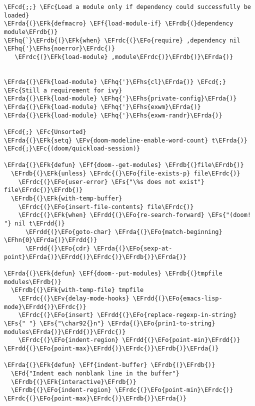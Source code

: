 \documentclass[a4wide,10pt]{article}
\newcommand{\EFc}[1]{\textcolor{EFc}{#1}} %
\newcommand{\EFcd}[1]{\textcolor{EFcd}{#1}} %
\newcommand{\EFs}[1]{\textcolor{EFs}{#1}} %
\newcommand{\EFd}[1]{\textcolor{EFd}{#1}} %
\newcommand{\EFk}[1]{\textcolor{EFk}{#1}} %
\newcommand{\EFf}[1]{\textcolor{EFf}{#1}} %
\newcommand{\EFv}[1]{\textcolor{EFv}{#1}} %
\newcommand{\EFo}[1]{\textcolor{EFo}{#1}} %
\newcommand{\EFhn}[1]{\textcolor{EFhn}{\textbf{#1}}} %
\newcommand{\EFhq}[1]{\textcolor{EFhq}{#1}} %
\newcommand{\EFhs}[1]{\textcolor{EFhs}{#1}} %
\newcommand{\EFrda}[1]{\textcolor{EFrda}{#1}} %
\newcommand{\EFrdb}[1]{\textcolor{EFrdb}{#1}} %
\newcommand{\EFrdc}[1]{\textcolor{EFrdc}{#1}} %
\newcommand{\EFrdd}[1]{\textcolor{EFrdd}{#1}} %
\begin{document}
\begin{Code}
\begin{Verbatim}
\EFcd{;;} \EFc{Load a module only if dependency could successfully be loaded}
\EFrda{(}\EFk{defmacro} \EFf{load-module-if} \EFrdb{(}dependency module\EFrdb{)}
\EFhq{`}\EFrdb{(}\EFk{when} \EFrdc{(}\EFo{require} ,dependency nil \EFhq{'}\EFhs{noerror}\EFrdc{)}
   \EFrdc{(}\EFk{load-module} ,module\EFrdc{)}\EFrdb{)}\EFrda{)}


\EFrda{(}\EFk{load-module} \EFhq{'}\EFhs{cl}\EFrda{)} \EFcd{;} \EFc{Still a requirement for ivy}
\EFrda{(}\EFk{load-module} \EFhq{'}\EFhs{private-config}\EFrda{)}
\EFrda{(}\EFk{load-module} \EFhq{'}\EFhs{exwm}\EFrda{)}
\EFrda{(}\EFk{load-module} \EFhq{'}\EFhs{exwm-randr}\EFrda{)}

\EFcd{;} \EFc{Unsorted}
\EFrda{(}\EFk{setq} \EFv{doom-modeline-enable-word-count} t\EFrda{)}
\EFcd{;}\EFc{(doom/quickload-session)}

\EFrda{(}\EFk{defun} \EFf{doom--get-modules} \EFrdb{(}file\EFrdb{)}
  \EFrdb{(}\EFk{unless} \EFrdc{(}\EFo{file-exists-p} file\EFrdc{)}
    \EFrdc{(}\EFo{user-error} \EFs{"\%s does not exist"} file\EFrdc{)}\EFrdb{)}
  \EFrdb{(}\EFk{with-temp-buffer}
    \EFrdc{(}\EFo{insert-file-contents} file\EFrdc{)}
    \EFrdc{(}\EFk{when} \EFrdd{(}\EFo{re-search-forward} \EFs{"(doom! "} nil t\EFrdd{)}
      \EFrdd{(}\EFo{goto-char} \EFrda{(}\EFo{match-beginning} \EFhn{0}\EFrda{)}\EFrdd{)}
      \EFrdd{(}\EFo{cdr} \EFrda{(}\EFo{sexp-at-point}\EFrda{)}\EFrdd{)}\EFrdc{)}\EFrdb{)}\EFrda{)}

\EFrda{(}\EFk{defun} \EFf{doom--put-modules} \EFrdb{(}tmpfile modules\EFrdb{)}
  \EFrdb{(}\EFk{with-temp-file} tmpfile
    \EFrdc{(}\EFv{delay-mode-hooks} \EFrdd{(}\EFo{emacs-lisp-mode}\EFrdd{)}\EFrdc{)}
    \EFrdc{(}\EFo{insert} \EFrdd{(}\EFo{replace-regexp-in-string} \EFs{" "} \EFs{"\char92{}n"} \EFrda{(}\EFo{prin1-to-string} modules\EFrda{)}\EFrdd{)}\EFrdc{)}
    \EFrdc{(}\EFo{indent-region} \EFrdd{(}\EFo{point-min}\EFrdd{)} \EFrdd{(}\EFo{point-max}\EFrdd{)}\EFrdc{)}\EFrdb{)}\EFrda{)}

\EFrda{(}\EFk{defun} \EFf{indent-buffer} \EFrdb{(}\EFrdb{)}
  \EFd{"Indent each nonblank line in the buffer"}
  \EFrdb{(}\EFk{interactive}\EFrdb{)}
  \EFrdb{(}\EFo{indent-region} \EFrdc{(}\EFo{point-min}\EFrdc{)} \EFrdc{(}\EFo{point-max}\EFrdc{)}\EFrdb{)}\EFrda{)}


\end{Verbatim}
\end{Code}
\end{document}
